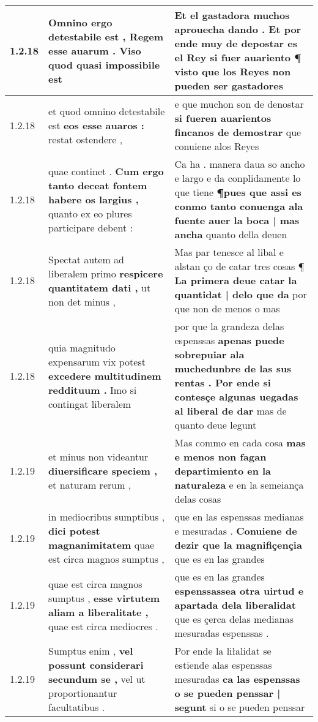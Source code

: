 \begin{tabular}{|p{1cm}|p{6.5cm}|p{6.5cm}|}
1.2.18 & Omnino ergo detestabile est , \textbf{ Regem esse auarum . } Viso quod quasi impossibile est & Et el gastadora muchos aprouecha dando . \textbf{ Et por ende muy de depostar es el Rey si fuer auariento ¶ visto } que los Reyes non pueden ser gastadores \\\hline
1.2.18 & et quod omnino detestabile est \textbf{ eos esse auaros : } restat ostendere , & e que muchon son de denostar \textbf{ si fueren auarientos fincanos de demostrar } que conuiene alos Reyes \\\hline
1.2.18 & quae continet . \textbf{ Cum ergo tanto deceat fontem habere os largius , } quanto ex eo plures participare debent : & Ca ha . manera daua so ancho e largo e da conplidamente lo que tiene \textbf{ ¶pues que assi es conmo tanto conuenga ala fuente auer la boca | mas ancha } quanto della deuen \\\hline
1.2.18 & Spectat autem ad liberalem primo \textbf{ respicere quantitatem dati , } ut non det minus , & Mas par tenesce al libal e alstan ço de catar tres cosas ¶ \textbf{ La primera deue catar la quantidat | delo que da } por que non de menos o mas \\\hline
1.2.18 & quia magnitudo expensarum vix potest \textbf{ excedere multitudinem reddituum . } Imo si contingat liberalem & por que la grandeza delas espenssas \textbf{ apenas puede sobrepuiar ala muchedunbre de las sus rentas . Por ende si contesçe algunas uegadas al liberal de dar } mas de quanto deue legunt \\\hline
1.2.19 & et minus non videantur \textbf{ diuersificare speciem , } et naturam rerum , & Mas commo en cada cosa \textbf{ mas e menos non fagan departimiento en la naturaleza } e en la semeiança delas cosas \\\hline
1.2.19 & in mediocribus sumptibus , \textbf{ dici potest magnanimitatem } quae est circa magnos sumptus , & que en las espenssas medianas e mesuradas . \textbf{ Conuiene de dezir que la magnifiçençia } que es en las grandes \\\hline
1.2.19 & quae est circa magnos sumptus , \textbf{ esse virtutem aliam a liberalitate , } quae est circa mediocres . & que es en las grandes \textbf{ espenssassea otra uirtud e apartada dela liberalidat } que es çerca delas medianas mesuradas espenssas . \\\hline
1.2.19 & Sumptus enim , \textbf{ vel possunt considerari secundum se , } vel ut proportionantur facultatibus . & Por ende la liłalidat se estiende alas espenssas mesuradas \textbf{ ca las espenssas o se pueden penssar | segunt } si o se pueden penssar \\\hline

\end{tabular}
